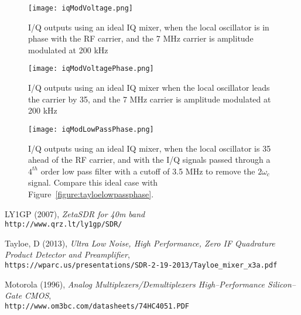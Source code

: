 \documentclass[11pt, twoside]{article}
\begin{document}
\begin{figure}
  \center \captionsetup{width=.8\linewidth}
  \texttt{[image: iqModVoltage.png]}
  \caption{I/Q outputs using an ideal IQ mixer, when the local
    oscillator is in phase with the RF carrier, and the 7 MHz carrier
    is amplitude modulated at 200 kHz}
  \label{figure:iqmod}
\end{figure}


\begin{figure}
  \center
    \captionsetup{width=.8\linewidth}
  \texttt{[image: iqModVoltagePhase.png]}
  \caption{I/Q outputs using an ideal IQ mixer when the local
    oscillator leads the carrier by 35\degree, and the 7 MHz carrier
    is amplitude modulated at 200 kHz}
  \label{figure:iqmodphase}
\end{figure}


\begin{figure}
  \center
    \captionsetup{width=.8\linewidth}
  \texttt{[image: iqModLowPassPhase.png]}
  \caption{I/Q outputs using an ideal IQ mixer, when the local
    oscillator is 35{\degree} ahead of the RF carrier, and with the
    I/Q signals passed through a $4^{th}$ order low pass filter with a
    cutoff of 3.5 MHz to remove the $2{\omega_c}$ signal.  Compare
    this ideal case with Figure~\ref{figure:tayloelowpassphase}.}
  \label{figure:iqmodlowpassphase}
\end{figure}

\begin{thebibliography}{9}
  LY1GP (2007), {\it ZetaSDR for 40m band}
  \\\texttt{http://www.qrz.lt/ly1gp/SDR/}
  
  Tayloe, D (2013), {\it Ultra Low Noise, High Performance, Zero IF Quadrature Product Detector and Preamplifier},
  \\\texttt{https://wparc.us/presentations/SDR-2-19-2013/Tayloe\_mixer\_x3a.pdf}

  Motorola (1996),
  {\it Analog Multiplexers/Demultiplexers High–Performance Silicon–Gate CMOS},
\\\texttt{http://www.om3bc.com/datasheets/74HC4051.PDF}
  
\end{thebibliography}
\end{document}
